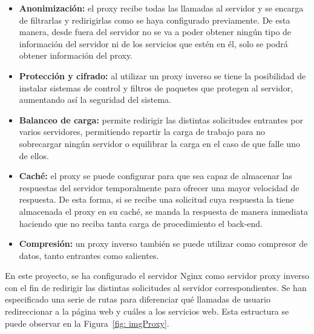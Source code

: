 \begin{itemize}
	
	\item \textbf{Anonimización:} el proxy recibe todas las llamadas al servidor y se encarga de filtrarlas y redirigirlas como se haya configurado previamente. De esta manera, desde fuera del servidor no se va a poder obtener ningún tipo de información del servidor ni de los servicios que estén en él, solo se podrá obtener información del proxy.
	
	\item \textbf{Protección y cifrado:} al utilizar un proxy inverso se tiene la posibilidad de instalar sistemas de control y filtros de paquetes que protegen al servidor, aumentando así la seguridad del sistema.
	
	\item \textbf{Balanceo de carga:} permite redirigir las distintas solicitudes entrantes por varios servidores, permitiendo repartir la carga de trabajo para no sobrecargar ningún servidor o equilibrar la carga en el caso de que falle uno de ellos.
	
	\item \textbf{Caché:} el proxy se puede configurar para que sea capaz de almacenar las respuestas del servidor temporalmente para ofrecer una mayor velocidad de respuesta. De esta forma, si se recibe una solicitud cuya respuesta la tiene almacenada el proxy en su caché, se manda la respuesta de manera inmediata haciendo que no reciba tanta carga de procedimiento el back-end.
	
	\item \textbf{Compresión:} un proxy inverso también se puede utilizar como compresor de datos, tanto entrantes como salientes.
	
\end{itemize}

En este proyecto, se ha configurado el servidor Nginx como servidor proxy inverso con el fin de redirigir las distintas solicitudes al servidor correspondientes. Se han especificado una serie de rutas para diferenciar qué llamadas de usuario redireccionar a la página web y cuáles a los servicios web. Esta estructura se puede observar en la Figura~\ref {fig: imgProxy}.



